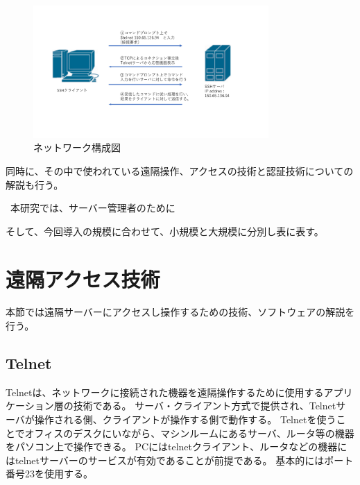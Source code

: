 \documentclass[12pt,a4paper,titlepage]{jsarticle}
\begin{document}
\begin{figure}[H]
    \centering
    \includegraphics*[width=0.8\textwidth,page=2]{graphs/network_archtecture.pdf}
    \caption{ネットワーク構成図}
    \label{network_graph}
\end{figure}

同時に、その中で使われている遠隔操作、アクセスの技術と認証技術についての解説も行う。

\ 本研究では、サーバー管理者のために

そして、今回導入の規模に合わせて、小規模と大規模に分別し表に表す。

\section{遠隔アクセス技術}
本節では遠隔サーバーにアクセスし操作するための技術、ソフトウェアの解説を行う。

\subsection{Telnet}
Telnetは、ネットワークに接続された機器を遠隔操作するために使用するアプリケーション層の技術である。
サーバ・クライアント方式で提供され、Telnetサーバが操作される側、クライアントが操作する側で動作する。
Telnetを使うことでオフィスのデスクにいながら、マシンルームにあるサーバ、ルータ等の機器をパソコン上で操作できる。
PCにはtelnetクライアント、ルータなどの機器にはtelnetサーバーのサービスが有効であることが前提である。
基本的にはポート番号23を使用する。
\end{document}
